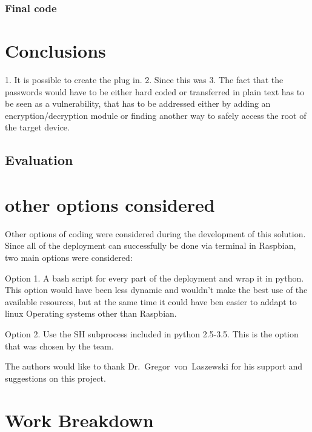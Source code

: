 	\subsubsection{Final code}
	
	
	
	
	\section{Conclusions}
	
	1. It is possible to create the plug in.
	2. Since this was 
	3. The fact that the passwords would have to be either hard coded
  or transferred in plain text has to be seen as a vulnerability, 
  that has to be addressed either by adding an encryption/decryption
  module or finding another way to safely access the root of 
  the target device.
	
	\subsection{Evaluation}
	
	
	\section{other options considered}

	Other options of coding were considered during the development 
  of this solution. 	Since all of the deployment can successfully
  be done via terminal in Raspbian, two main options were considered:
	
	Option 1. A bash script for every part of the deployment and wrap
  it in python. This option would have been less dynamic and 
  wouldn't make the best use of the available resources, but 
  at the same time it could have ben easier to addapt to linux
  Operating systems other than Raspbian.
  
	Option 2. Use the SH subprocess included in python 2.5-3.5. 
  This is the option that was chosen by the team.
	
	
	\begin{acks}
	The authors would like to thank Dr.~Gregor~von~Laszewski for his
  support and suggestions on this project.
	\end{acks}
	
	
	
	
	\newpage
	
	\appendix
	
	\section{Work Breakdown}
	
